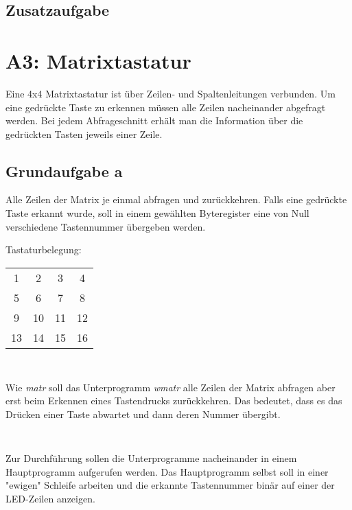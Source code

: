 \documentclass[a4paper,12pt,titlepage]{scrartcl}
\begin{document}
\subsection*{Zusatzaufgabe}

\section*{A3: Matrixtastatur}
Eine 4x4 Matrixtastatur ist über Zeilen- und Spaltenleitungen verbunden. Um eine gedrückte Taste zu erkennen müssen alle Zeilen nacheinander abgefragt werden. Bei jedem Abfrageschnitt erhält man die Information über die gedrückten Tasten jeweils einer Zeile. 

\subsection*{Grundaufgabe a}
Alle Zeilen der Matrix je einmal abfragen und zurückkehren. Falls eine gedrückte Taste erkannt wurde, soll in einem gewählten Byteregister eine von Null verschiedene Tastennummer übergeben werden. 

Tastaturbelegung:
\begin{tabular}{c|c|c|c}
    1 & 2 & 3 & 4\\
    5 & 6 & 7 & 8\\
    9 &10 &11 &12\\
   13 &14 &15 &16
\end{tabular}
\begin{lstlisting}[caption= matr]
    
\end{lstlisting}

Wie \textit{matr} soll das Unterprogramm \textit{wmatr} alle Zeilen der Matrix abfragen aber erst beim Erkennen eines Tastendrucks zurückkehren. Das bedeutet, dass es das Drücken einer Taste abwartet und dann deren Nummer übergibt. 
\begin{lstlisting}[caption= wmatr]
    
\end{lstlisting}

Zur Durchführung sollen die Unterprogramme nacheinander in einem Hauptprogramm aufgerufen werden. Das Hauptprogramm selbst soll in einer "ewigen" Schleife arbeiten und die erkannte Tastennummer binär auf einer der LED-Zeilen anzeigen. 
\begin{lstlisting}[caption= mainA]
    
\end{lstlisting}
\end{document}
